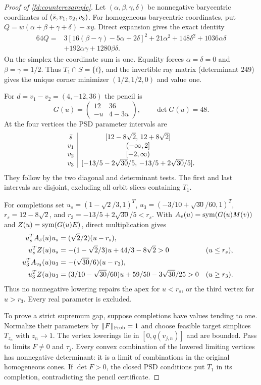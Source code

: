 \begin{proof}[Proof of \cref{fd:counterexample}]
\label{fd:counterexample-proof}
Let $(\alpha,\beta,\gamma,\delta)$ be nonnegative
barycentric coordinates of $(\bar s,v_1,v_2,v_3)$.
For homogeneous barycentric coordinates, put
$Q=w(\alpha+\beta+\gamma+\delta)-xy$.
Direct expansion gives the exact identity
\begin{align*}
64Q={}&3[16(\beta-\gamma)-5\alpha+2\delta]^2
       +21\alpha^2+148\delta^2+1036\alpha\delta\\
     &+192\alpha\gamma+1280\beta\delta.
\end{align*}
On the simplex the coordinate sum is one.
Equality forces $\alpha=\delta=0$ and $\beta=\gamma=1/2$.
Thus $T_1\cap S=\{t\}$, and the invertible ray matrix
(determinant $249$) gives the unique corner minimizer
$(1/2,1/2,0)$ and value one.

For $d=v_1-v_2=(4,-12,36)$ the pencil is
\[
 G(u)=\begin{pmatrix}12&36\\-u&4-3u\end{pmatrix},
 \qquad \det G(u)=48.
\]
At the four vertices the PSD parameter intervals are
\[
 \begin{array}{c|c}
 \bar s &[12-8\sqrt2,\,12+8\sqrt2]\\
 v_1 &(-\infty,2]\\
 v_2 &[-2,\infty)\\
 v_3 &[-13/5-2\sqrt{30}/5,\,-13/5+2\sqrt{30}/5].
 \end{array}
\]
They follow by the two diagonal and determinant tests.
The first and last intervals are disjoint, excluding
all orbit slices containing $T_1$.

For completions set
$u_s=(1-\sqrt2/3,1)^T$,
$u_3=(-3/10+\sqrt{30}/60,1)^T$,
$r_s=12-8\sqrt2$, and
$r_3=-13/5+2\sqrt{30}/5<r_s$.
With $A_v(u)=\operatorname{sym}(G(u)M(v))$ and $Z(u)=\operatorname{sym}(G(u)E)$,
direct multiplication gives
\begin{align*}
 u_s^TA_{\bar s}(u)u_s&=(\sqrt2/2)(u-r_s),\\
 u_s^TZ(u)u_s&=-(1-\sqrt2/3)u+44/3-8\sqrt2>0
       &&(u\le r_s),\\
 u_3^TA_{v_3}(u)u_3&=-(\sqrt{30}/6)(u-r_3),\\
 u_3^TZ(u)u_3&=(3/10-\sqrt{30}/60)u+59/50-3\sqrt{30}/25>0
       &&(u\ge r_3).
\end{align*}
Thus no nonnegative lowering repairs the apex for $u<r_s$,
or the third vertex for $u>r_3$. Every real parameter is excluded.

To prove a strict supremum gap, suppose completions have
values tending to one. Normalize their parameters by
$\lVert F\rVert_{\rm Frob}=1$ and choose feasible target simplices
$T_{z_n}$ with $z_n\to1$.
The vertex lowerings lie in $[0,q(v_{j,n})]$ and are bounded.
Pass to limits $F\ne0$ and $\tau_j$.
Every convex combination of the lowered limiting vertices
has nonnegative determinant: it is a limit of combinations
in the original homogeneous cones.
If $\det F>0$, the closed PSD conditions put $T_1$ in its
completion, contradicting the pencil certificate.


\end{proof}
